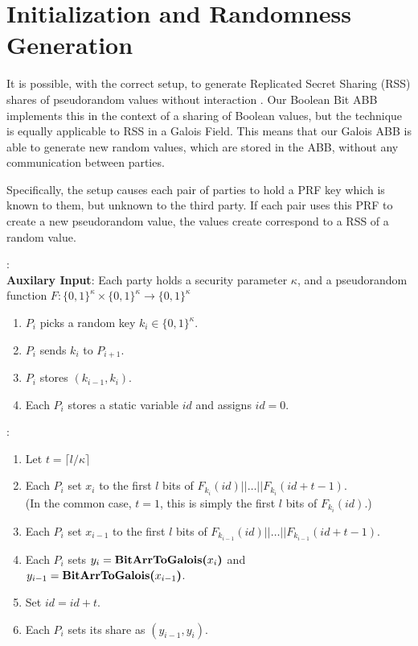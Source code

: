 \section{Initialization and Randomness Generation}

It is possible, with the correct setup, to generate 
Replicated Secret Sharing (RSS) shares
of pseudorandom values without interaction \cite{TCC:CraDamIsh05}.
Our Boolean Bit ABB implements this in the context of a sharing
of Boolean values, but the technique is equally applicable
to RSS in a Galois Field.
This means that our Galois ABB is able to generate new random values,
which are stored in the ABB, without any communication between parties.

Specifically, the setup causes each pair of parties to hold a PRF key
which is known to them, but unknown to the third party.
If each pair uses this PRF to create a new pseudorandom value,
the values create correspond to a RSS of a random value.

\begin{protocol}[Setup]
	\GalSetup{}:\\
	\textbf{Auxilary Input}: 
	Each party holds a security parameter $\kappa$,
	and a pseudorandom function 
	$F:\{0,1\}^{\kappa} \times \{0,1\}^\kappa \rightarrow \{0,1\}^\kappa$
	\begin{enumerate}
		\item $P_i$ picks a random key $k_i \in \{0, 1\}^\kappa$.
		\item $P_i$ sends $k_i$ to $P_{i+1}$.
		\item $P_i$ stores $(k_{i-1}, k_i)$.
		\item Each $P_i$ stores a static variable $id$ and assigns $id=0$.
	\end{enumerate}
\end{protocol}

\begin{protocol}[Random]
	:
	\begin{enumerate}
		\item Let $t = \lceil l/\kappa \rceil$
		\item Each $P_i$ 
			set $x_i$ to the first $l$ bits of
			$F_{k_i}(id) || \ldots || F_{k_i}(id+t-1)$.\\
			(In the common case, $t=1$, this is simply
			the first $l$ bits of $F_{k_i}(id)$.)
		\item Each $P_i$ 
			set $x_{i-1}$ to the first $l$ bits of
			$F_{k_{i-1}}(id) || \ldots || F_{k_{i-1}}(id+t-1)$.
		\item Each $P_i$ sets $y_i = \textbf{BitArrToGalois(}x_i\textbf{)}$ and\\ 
			$y_{i-1} = \textbf{BitArrToGalois(}x_{i-1}\textbf{)}$.
		\item Set $id = id + t$.
		\item Each $P_i$ sets its share as $(y_{i-1}, y_i)$. 
	\end{enumerate}
\end{protocol}
